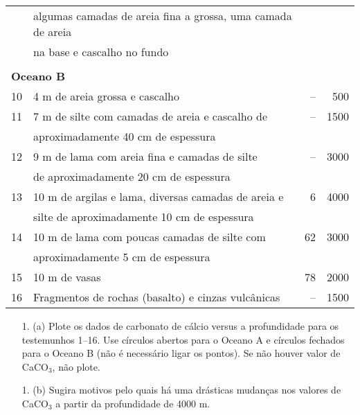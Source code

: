 \documentclass[a4paper,10pt]{article}
\begin{document}
{\begin{center}
\begin{tabular}{l l r r}
      & algumas camadas de areia fina a grossa, uma camada de areia     &    &      \\
      & na base e cascalho no fundo                                     &    &      \\
    \multicolumn{4}{l}{\phantom{}} \\
    \multicolumn{4}{l}{{\bf Oceano B}} \\
    10 & 4 m de areia grossa e cascalho                                 & -- &  500 \\
    11 & 7 m de silte com camadas de areia e cascalho de                & -- & 1500 \\
       & aproximadamente 40 cm de espessura                             &    &      \\
    12 & 9 m de lama com areia fina e camadas de silte                  & -- & 3000 \\
       & de aproximadamente 20 cm de espessura                          &    &      \\
    13 & 10 m de argilas e lama, diversas camadas de areia e            &  6 & 4000 \\
       & silte de aproximadamente 10 cm de espessura                    &    &      \\
    14 & 10 m de lama com poucas camadas de silte com                   & 62 & 3000 \\
       & aproximadamente 5 cm de espessura                              &    &      \\
    15 & 10 m de vasas                                                  & 78 & 2000 \\
    16 & Fragmentos de rochas (basalto) e cinzas vulcânicas             & -- & 1500 \\
    \hline
  \end{tabular}
\end{center}
}

\newpage


\def\width{9}
\def\hauteur{8}


\phantom{}

\vspace{2cm}

\begin{center}
  \begin{itemize}
    \item[1. (a)] Plote os dados de carbonato de cálcio versus a profundidade para os testemunhos  1--16. Use círculos abertos para o Oceano A e círculos fechados para o Oceano B (não é necessário ligar os pontos). Se não houver valor de CaCO$_3$, não plote. 
    
     \item[1. (b)] Sugira motivos pelo quais há uma drásticas mudanças nos valores de CaCO$_3$ a partir da profundidade de 4000 m. 
     
  \end{itemize}
\end{center}
\end{document}
